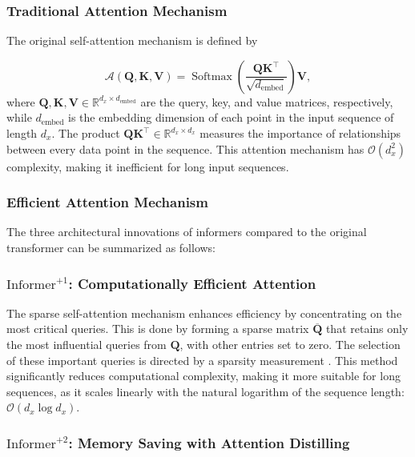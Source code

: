 \subsubsection*{Traditional Attention Mechanism}

The original self-attention mechanism \cite{vaswani2017attention} is defined by

\begin{equation}
\mathcal{A}(\mathbf{Q}, \mathbf{K}, \mathbf{V}) = \operatorname{Softmax}\left(\frac{\mathbf{QK}^\top}{\sqrt{d_{\text{embed}}}}\right) \mathbf{V},
\end{equation}
where $\mathbf{Q}, \mathbf{K}, \mathbf{V} \in \mathbb{R}^{d_x \times d_{\text{embed}}}$ are the query, key, and value matrices, respectively, while $d_{\text{embed}}$ is the embedding dimension of each point in the input sequence of length $d_x$. The product $\mathbf{QK}^\top \in \mathbb{R}^{d_x \times d_x}$ measures the importance of relationships between every data point in the sequence. This attention mechanism has $\mathcal{O}(d_x^2)$ complexity, making it inefficient for long input sequences.


\subsubsection*{Efficient Attention Mechanism}

The three architectural innovations of informers compared to the original transformer can be summarized as follows:
\subsubsection*{$\text{Informer}^{+1}$: Computationally Efficient Attention}

The sparse self-attention mechanism enhances efficiency by concentrating on the most critical queries. This is done by forming a sparse matrix $\overline{\mathbf{Q}}$ that retains only the most influential queries from $\mathbf{Q}$, with other entries set to zero. The selection of these important queries is directed by a sparsity measurement \cite{zhou2021informer}. This method significantly reduces computational complexity, making it more suitable for long sequences, as it scales linearly with the natural logarithm of the sequence length: $\mathcal{O}(d_x \log d_x)$.

\subsubsection*{$\text{Informer}^{+2}$: Memory Saving with Attention Distilling}

